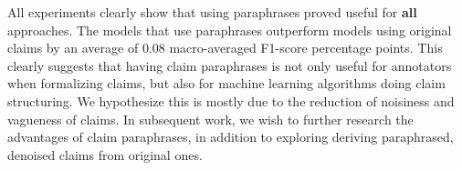 
All experiments clearly show that using paraphrases proved useful for
\textbf{all} approaches.  The models that use paraphrases outperform models
using original claims by an average of $0.08$ macro-averaged F1-score
percentage points.  This clearly suggests that having claim paraphrases is not
only useful for annotators when formalizing claims, but also for machine
learning algorithms doing claim structuring.  We hypothesize this is mostly due
to the reduction of noisiness and vagueness of claims.  In subsequent work, we wish
to further research the advantages of claim paraphrases, in addition to 
exploring deriving paraphrased, denoised claims from original ones. 


